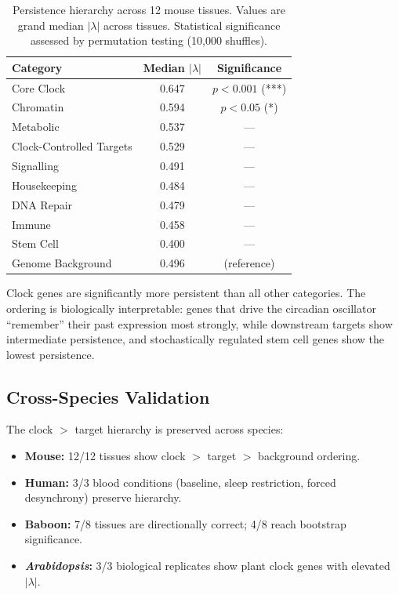 \documentclass[11pt,letterpaper]{article}
\begin{document}
\begin{table}[H]
\centering
\caption{Persistence hierarchy across 12 mouse tissues. Values are grand median $|\lambda|$ across tissues. Statistical significance assessed by permutation testing (10,000 shuffles).}
\label{tab:hierarchy}
\begin{tabular}{lcc}
\toprule
\textbf{Category} & \textbf{Median $|\lambda|$} & \textbf{Significance} \\
\midrule
Core Clock & 0.647 & $p < 0.001$ (***) \\
Chromatin & 0.594 & $p < 0.05$ (*) \\
Metabolic & 0.537 & --- \\
Clock-Controlled Targets & 0.529 & --- \\
Signalling & 0.491 & --- \\
Housekeeping & 0.484 & --- \\
DNA Repair & 0.479 & --- \\
Immune & 0.458 & --- \\
Stem Cell & 0.400 & --- \\
\midrule
Genome Background & 0.496 & (reference) \\
\bottomrule
\end{tabular}
\end{table}

Clock genes are significantly more persistent than all other categories. The ordering is biologically interpretable: genes that drive the circadian oscillator ``remember'' their past expression most strongly, while downstream targets show intermediate persistence, and stochastically regulated stem cell genes show the lowest persistence.

\subsection{Cross-Species Validation}

The clock $>$ target hierarchy is preserved across species:

\begin{itemize}
\item \textbf{Mouse:} 12/12 tissues show clock $>$ target $>$ background ordering.
\item \textbf{Human:} 3/3 blood conditions (baseline, sleep restriction, forced desynchrony) preserve hierarchy.
\item \textbf{Baboon:} 7/8 tissues are directionally correct; 4/8 reach bootstrap significance.
\item \textbf{\textit{Arabidopsis}:} 3/3 biological replicates show plant clock genes with elevated $|\lambda|$.
\end{itemize}
\end{document}
